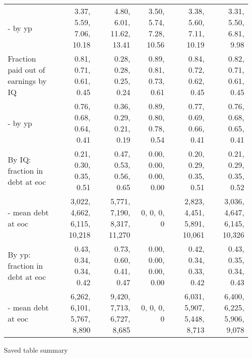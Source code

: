 \begin{tabular}{lrrrrr}
- by yp & 3.37, 5.59, 7.06, 10.18  & 4.80, 6.01, 11.62, 13.41  & 3.50, 5.74, 7.28, 10.56  & 3.38, 5.60, 7.11, 10.19  & 3.31, 5.50, 6.81, 9.98  \\ 
Fraction paid out of earnings by IQ & 0.81, 0.71, 0.61, 0.45  & 0.28, 0.28, 0.25, 0.24  & 0.89, 0.81, 0.73, 0.61  & 0.84, 0.72, 0.62, 0.45  & 0.82, 0.71, 0.61, 0.45  \\ 
- by yp & 0.76, 0.68, 0.64, 0.41  & 0.36, 0.29, 0.21, 0.19  & 0.89, 0.80, 0.78, 0.54  & 0.77, 0.69, 0.66, 0.41  & 0.76, 0.68, 0.65, 0.41  \\ 
By IQ: fraction in debt at eoc & 0.21, 0.30, 0.35, 0.51  & 0.47, 0.53, 0.56, 0.65  & 0.00, 0.00, 0.00, 0.00  & 0.20, 0.29, 0.35, 0.51  & 0.21, 0.29, 0.35, 0.52  \\ 
- mean debt at eoc & 3,022, 4,662, 6,115, 10,218  & 5,771, 7,190, 8,317, 11,270  & 0, 0, 0, 0  & 2,823, 4,451, 5,891, 10,061  & 3,036, 4,647, 6,145, 10,326  \\ 
By yp: fraction in debt at eoc & 0.43, 0.34, 0.34, 0.42  & 0.73, 0.60, 0.41, 0.47  & 0.00, 0.00, 0.00, 0.00  & 0.42, 0.34, 0.33, 0.42  & 0.43, 0.35, 0.34, 0.43  \\ 
- mean debt at eoc & 6,262, 6,101, 5,767, 8,890  & 9,420, 7,713, 6,727, 8,685  & 0, 0, 0, 0  & 6,031, 5,907, 5,448, 8,713  & 6,400, 6,225, 5,906, 9,078  \\ 
\hline
\end{tabular}%
Saved table summary

